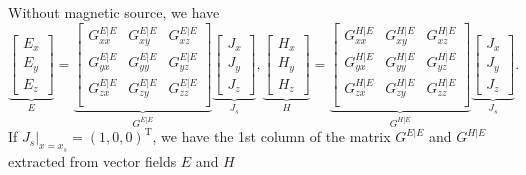 \documentclass[a4paper,10pt]{article}
\begin{document}
Without magnetic source, we have 
\begin{equation}
  \underbrace{\begin{bmatrix}
    E_x\\
    E_y\\
    E_z
  \end{bmatrix}}_E =\underbrace{\begin{bmatrix}
      G_{xx}^{E|E} &G_{xy}^{E|E} & G_{xz}^{E|E} \\
      G_{yx}^{E|E} &G_{yy}^{E|E} & G_{yz}^{E|E} \\
      G_{zx}^{E|E} &G_{zy}^{E|E} & G_{zz}^{E|E} \\
  \end{bmatrix}}_{G^{E|E}}\underbrace{\begin{bmatrix}
    J_x\\
    J_y\\
    J_z
  \end{bmatrix}}_{J_s} ,
  \underbrace{\begin{bmatrix}
    H_x\\
    H_y\\
    H_z
  \end{bmatrix}}_H =\underbrace{\begin{bmatrix}
      G_{xx}^{H|E} &G_{xy}^{H|E} & G_{xz}^{H|E} \\
      G_{yx}^{H|E} &G_{yy}^{H|E} & G_{yz}^{H|E} \\
      G_{zx}^{H|E} &G_{zy}^{H|E} & G_{zz}^{H|E} \\
  \end{bmatrix}}_{G^{H|E}}\underbrace{\begin{bmatrix}
    J_x\\
    J_y\\
    J_z
  \end{bmatrix}}_{J_s}.
\end{equation}
If $J_s|_{x=x_s}=(1,0,0)^\mathrm{T}$, we have the 1st column of the matrix $G^{E|E}$ and $G^{H|E}$ extracted from vector fields $E$ and $H$
\end{document}
